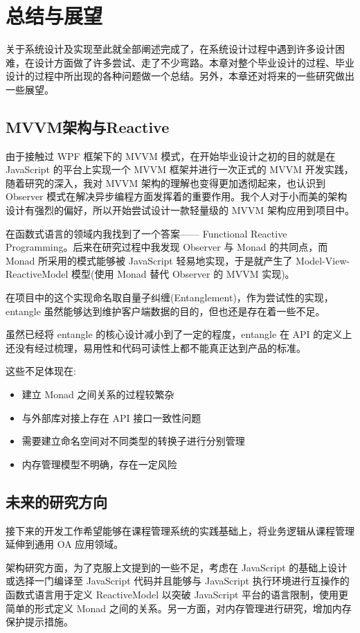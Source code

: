 \chapter{总结与展望}

关于系统设计及实现至此就全部阐述完成了，在系统设计过程中遇到许多设计困难，在设计方面做了许多尝试、走了不少弯路。本章对整个毕业设计的过程、毕业设计的过程中所出现的各种问题做一个总结。另外，本章还对将来的一些研究做出一些展望。

\section{MVVM架构与Reactive}

由于接触过 WPF 框架下的 MVVM 模式，在开始毕业设计之初的目的就是在 JavaScript 的平台上实现一个 MVVM 框架并进行一次正式的 MVVM 开发实践，随着研究的深入，我对 MVVM 架构的理解也变得更加透彻起来，也认识到 Observer 模式在解决异步编程方面发挥着的重要作用。我个人对于小而美的架构设计有强烈的偏好，所以开始尝试设计一款轻量级的 MVVM 架构应用到项目中。

在函数式语言的领域内我找到了一个答案—— Functional Reactive Programming。后来在研究过程中我发现 Observer 与 Monad 的共同点，而 Monad 所采用的模式能够被 JavaScript 轻易地实现，于是就产生了 Model-View-ReactiveModel 模型(使用 Monad 替代 Observer 的 MVVM 实现)。

在项目中的这个实现命名取自量子纠缠(Entanglement)，作为尝试性的实现，entangle 虽然能够达到维护客户端数据的目的，但也还是存在着一些不足。

虽然已经将 entangle 的核心设计减小到了一定的程度，entangle 在 API 的定义上还没有经过梳理，易用性和代码可读性上都不能真正达到产品的标准。

这些不足体现在:

\begin{itemize}
  \item 建立 Monad 之间关系的过程较繁杂
  \item 与外部库对接上存在 API 接口一致性问题
  \item 需要建立命名空间对不同类型的转换子进行分别管理
  \item 内存管理模型不明确，存在一定风险
\end{itemize}

\section{未来的研究方向}

接下来的开发工作希望能够在课程管理系统的实践基础上，将业务逻辑从课程管理延伸到通用 OA 应用领域。

架构研究方面，为了克服上文提到的一些不足，考虑在 JavaScript 的基础上设计或选择一门编译至 JavaScript 代码并且能够与 JavaScript 执行环境进行互操作的函数式语言用于定义 ReactiveModel 以突破 JavaScript 平台的语言限制，使用更简单的形式定义 Monad 之间的关系。另一方面，对内存管理进行研究，增加内存保护提示措施。

